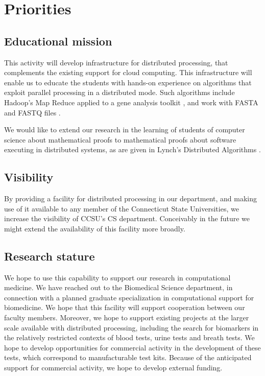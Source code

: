 \documentclass[]{article}
\title{}
\author{}
\begin{document}
\maketitle



\section{Priorities}
\subsection{Educational mission}
This activity will  develop infrastructure for distributed processing, that complements the existing support for cloud computing. This infrastructure will enable us to educate the students with hands-on experience on algorithms that exploit parallel processing in a distributed mode. Such algorithms include Hadoop's Map Reduce applied to a gene analysis toolkit \cite{mckenna2010genome,taylor2010overview}, and work with FASTA and FASTQ files \cite{ferraro2017fastdoop}.

We would like to extend our research in the learning of students of computer science about mathematical proofs \cite{smith2013mathematization,smith2014computer,smith2016categories} to mathematical proofs about software executing in distributed systems, as are given in Lynch's Distributed Algorithms \cite{lynch1996distributed}.
\subsection{Visibility}
By providing a facility for distributed processing in our department, and making use of it available to any member of the Connecticut State Universities, we increase the visibility of CCSU's CS department. Conceivably in the future we might extend the availability of this facility more broadly.
\subsection{Research stature}
We hope to use this capability to support our research in computational medicine. We have reached out to the Biomedical Science department, in connection with a planned graduate specialization in computational support for biomedicine. We hope that this facility will support cooperation between our faculty members. Moreover, we hope to support existing projects at the larger scale available with distributed processing, including the search for biomarkers in the relatively restricted contexts of blood tests, urine tests and breath tests. We hope to develop opportunities for commercial activity in the development of these tests, which correspond to manufacturable test kits. Because of the anticipated support for commercial activity, we hope to develop external funding.
\end{document}
